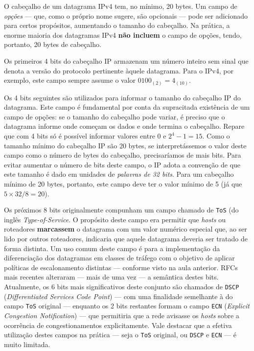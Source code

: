 \documentclass{article}
\begin{document}
O cabeçalho de um datagrama IPv4 tem, no mínimo, 20 bytes. Um campo de \textit{opções} --- que, como o próprio nome sugere, são opcionais --- pode ser adicionado para certos propósitos, aumentando o tamanho do cabeçalho. Na prática, a enorme maioria dos datagramas IPv4 \textbf{não incluem} o campo de opções, tendo, portanto, 20 bytes de cabeçalho.

Os primeiros 4 bits do cabeçalho IP armazenam um número inteiro sem sinal que denota a versão do protocolo pertinente àquele datagrama. Para o IPv4, por exemplo, este campo sempre assume o valor $0100_{(2)} = 4_{(10)}$. 

Os 4 bits seguintes são utilizados para informar o tamanho do cabeçalho IP do datagrama. Este campo é fundamental por conta da supracitada existência de um campo de opções: se o tamanho do cabeçalho pode variar, é preciso que o datagrama informe onde começam os dados e onde termina o cabeçalho. Repare que com 4 bits só é possível informar valores entre $0$ e $2^4-1 = 15$. Como o tamanho mínimo do cabeçalho IP são 20 bytes, se interpretássemos o valor deste campo como o número de bytes do cabeçalho, precisaríamos de mais bits. Para evitar aumentar o número de bits deste campo, o IP adota a convenção de que este tamanho é dado em unidades de \textit{palavras de 32 bits}. Para um cabeçalho mínimo de 20 bytes, portanto, este campo deve ter o valor mínimo de 5 (já que $5\times32/8 = 20$).

Os próximos 8 bits originalmente compunham um campo chamado de \texttt{ToS} (do inglês \textit{Type-of-Service}. O propósito deste campo era permitir que \textit{hosts} ou roteadores \textbf{marcassem} o datagrama com um valor numérico especial que, ao ser lido por outros roteadores, indicaria que aquele datagrama deveria ser tratado de forma distinta. Um uso comum deste campo é para a implementação da diferenciação dos datagramas em classes de tráfego com o objetivo de aplicar políticas de escalonamento distintas --- conforme visto na aula anterior. RFCs mais recentes alteraram --- mais de uma vez --- a semântica destes bits. Atualmente, os 6 bits mais significativos deste conjunto são chamados de \texttt{DSCP} (\textit{Differentiated Services Code Point}) --- com uma finalidade semelhante à do campo \texttt{ToS} original --- enquanto os 2 bits restantes formam o campo \texttt{ECN} (\textit{Explicit Congestion Notification}) --- que permitiria que a rede avisasse os \textit{hosts} sobre a ocorrência de congestionamentos explicitamente. Vale destacar que a efetiva utilização destes campos na prática --- seja o \texttt{ToS} original, ou \texttt{DSCP} e \texttt{ECN} --- é muito limitada.
\end{document}
